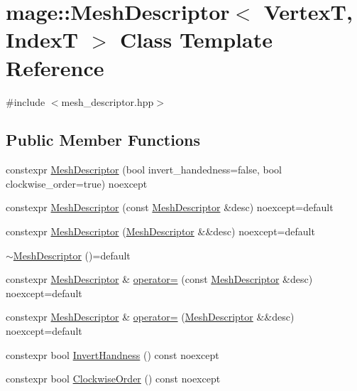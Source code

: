 \hypertarget{classmage_1_1_mesh_descriptor}{}\section{mage\+:\+:Mesh\+Descriptor$<$ VertexT, IndexT $>$ Class Template Reference}
\label{classmage_1_1_mesh_descriptor}


{\ttfamily \#include $<$mesh\+\_\+descriptor.\+hpp$>$}

\subsection*{Public Member Functions}
\begin{DoxyCompactItemize}
\item 
constexpr \hyperlink{classmage_1_1_mesh_descriptor_aab7cab220ecd16b78209000664c74231}{Mesh\+Descriptor} (bool invert\+\_\+handedness=false, bool clockwise\+\_\+order=true) noexcept
\item 
constexpr \hyperlink{classmage_1_1_mesh_descriptor_a5265ab6ae614b082d91e41f6117ce15f}{Mesh\+Descriptor} (const \hyperlink{classmage_1_1_mesh_descriptor}{Mesh\+Descriptor} \&desc) noexcept=default
\item 
constexpr \hyperlink{classmage_1_1_mesh_descriptor_af19be91547fed5b9b2be4ac23fb71ef4}{Mesh\+Descriptor} (\hyperlink{classmage_1_1_mesh_descriptor}{Mesh\+Descriptor} \&\&desc) noexcept=default
\item 
\hyperlink{classmage_1_1_mesh_descriptor_a7a2998a335d355ea366df8df1b1df0e5}{$\sim$\+Mesh\+Descriptor} ()=default
\item 
constexpr \hyperlink{classmage_1_1_mesh_descriptor}{Mesh\+Descriptor} \& \hyperlink{classmage_1_1_mesh_descriptor_a022e345285b4d307e69ddafe6a478a97}{operator=} (const \hyperlink{classmage_1_1_mesh_descriptor}{Mesh\+Descriptor} \&desc) noexcept=default
\item 
constexpr \hyperlink{classmage_1_1_mesh_descriptor}{Mesh\+Descriptor} \& \hyperlink{classmage_1_1_mesh_descriptor_abc2aa63cc03fd7b7ca736129bd5bc0fd}{operator=} (\hyperlink{classmage_1_1_mesh_descriptor}{Mesh\+Descriptor} \&\&desc) noexcept=default
\item 
constexpr bool \hyperlink{classmage_1_1_mesh_descriptor_a570ac8d10bafca62cc24226434c817e8}{Invert\+Handness} () const noexcept
\item 
constexpr bool \hyperlink{classmage_1_1_mesh_descriptor_a4694588682a42e5abf7c10e33a48d9bf}{Clockwise\+Order} () const noexcept
\end{DoxyCompactItemize}

